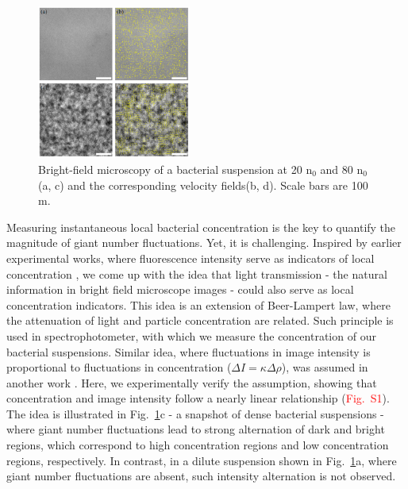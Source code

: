 \documentclass[twocolumn,aps,prl,amsmath,amssymb,longbibliography]{revtex4-1}
\begin{document}
\begin{figure}[h]
\begin{center}
\includegraphics[width=0.45\textwidth]{figures/fig-1-v2.png}
\caption[]{Bright-field microscopy of a bacterial suspension at 20 n$_0$ and 80 n$_0$ (a, c) and the corresponding velocity fields(b, d). Scale bars are 100 \textmu m.}
\label{fig:1}
\end{center}
\end{figure}

Measuring instantaneous local bacterial concentration is the key to quantify the magnitude of giant number fluctuations. Yet, it is challenging. Inspired by earlier experimental works, where fluorescence intensity serve as indicators of local concentration \cite{Schaller4488}, we come up with the idea that light transmission - the natural information in bright field microscope images - could also serve as local concentration indicators. This idea is an extension of Beer-Lampert law, where the attenuation of light and particle concentration are related. Such principle is used in spectrophotometer, with which we measure the concentration of our bacterial suspensions. Similar idea, where fluctuations in image intensity is proportional to fluctuations in concentration ($\Delta I=\kappa\Delta\rho$), was assumed in another work \cite{PhysRevLett.106.018101}. Here, we experimentally verify the assumption, showing that concentration and image intensity follow a nearly linear relationship (\textcolor{red}{Fig.~S1}). The idea is illustrated in Fig.~\ref{fig:1}c - a snapshot of dense bacterial suspensions - where giant number fluctuations lead to strong alternation of dark and bright regions, which correspond to high concentration regions and low concentration regions, respectively. In contrast, in a dilute suspension shown in Fig.~\ref{fig:1}a, where giant number fluctuations are absent, such intensity alternation is not observed.
\end{document}

